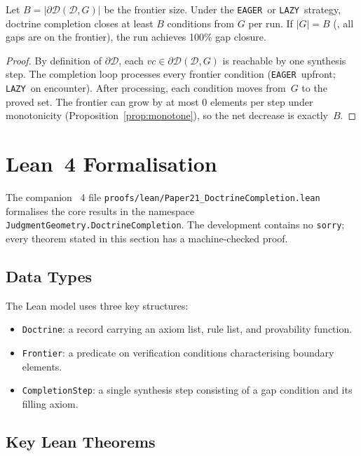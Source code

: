 \documentclass[11pt]{article}
\newcommand{\Doct}{\mathcal{D}}           %
\newcommand{\DoctF}{\partial\Doct}        %
\newcommand{\VC}{\mathit{vc}}             %
\newcommand{\EAGER}{\texttt{EAGER}}
\newcommand{\LAZY}{\texttt{LAZY}}
\begin{document}
\begin{theorem}\label{thm:closure-rate}
Let $B = |\DoctF(\Doct, G)|$ be the frontier size.  Under the
\EAGER\ or \LAZY\ strategy, doctrine completion closes at least
$B$ conditions from $G$ per run.  If $|G| = B$ (\ie, all gaps
are on the frontier), the run achieves 100\% gap closure.
\end{theorem}
\begin{proof}
By definition of $\DoctF$, each $\VC \in \DoctF(\Doct, G)$ is
reachable by one synthesis step.  The completion loop processes every
frontier condition (\EAGER\ upfront; \LAZY\ on encounter).  After
processing, each condition moves from~$G$ to the proved set.
The frontier can grow by at most 0 elements per step under
monotonicity (Proposition~\ref{prop:monotone}), so the net decrease
is exactly~$B$.
\end{proof}

\section{Lean~4 Formalisation}\label{sec:lean}

The companion \LEAN{}~4 file
\texttt{proofs/lean/Paper21\_DoctrineCompletion.lean}
formalises the core results in the namespace
\texttt{JudgmentGeometry.DoctrineCompletion}.  The development
contains no \texttt{sorry}; every theorem stated in this section
has a machine-checked proof.

\subsection{Data Types}

The Lean model uses three key structures:

\begin{itemize}[leftmargin=2em]
  \item \texttt{Doctrine}: a record carrying an axiom list,
        rule list, and provability function.
  \item \texttt{Frontier}: a predicate on verification conditions
        characterising boundary elements.
  \item \texttt{CompletionStep}: a single synthesis step consisting of
        a gap condition and its filling axiom.
\end{itemize}

\subsection{Key Lean Theorems}
\end{document}
